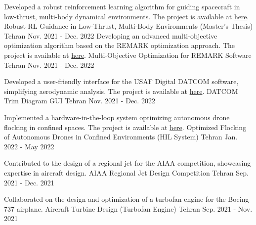 
\begin{cventries}
	
	\cventry
	{Developed a robust reinforcement learning algorithm for guiding spacecraft in low-thrust, multi-body dynamical environments.  The project is available at \href{https://github.com/alibaniasad1999/master-thesis}{here}.}
	{Robust RL Guidance in Low-Thrust, Multi-Body Environments (Master's Thesis)}
	{Tehran}
	{Nov. 2021 - Dec. 2022}
	 {}
	\cventry
	{Developing an advanced multi-objective optimization algorithm based on the REMARK optimization approach. The project is available at \href{https://github.com/alibaniasad1999/Heuristic-optimization-algorithms}{here}.}
	{Multi-Objective Optimization for REMARK Software}
	{Tehran}
	{Nov. 2021 - Dec. 2022}
	{}
	
	\cventry
	{Developed a user-friendly interface for the USAF Digital DATCOM software, simplifying aerodynamic analysis.
	  The project is available at \href{https://github.com/alibaniasad1999/DATCOM-Trim-Diagram-GUI}{here}.
	}
	{DATCOM Trim Diagram GUI}
	{Tehran}
	{Nov. 2021 - Dec. 2022}
	{}
	
	\cventry
	{Implemented a hardware-in-the-loop system optimizing autonomous drone flocking in confined spaces.
		  The project is available at \href{https://github.com/alibaniasad1999/Guidance-and-navigation}{here}.
	}
	{Optimized Flocking of Autonomous Drones in Confined Environments (HIL System)}
	{Tehran}
	{Jan. 2022 - May 2022}
	{}
	
	\cventry
	{Contributed to the design of a regional jet for the AIAA competition, showcasing expertise in aircraft design.}
	{AIAA Regional Jet Design Competition}
	{Tehran}
	{Sep. 2021 - Dec. 2021}
	{}
	
	\cventry
	{Collaborated on the design and optimization of a turbofan engine for the Boeing 737 airplane.}
	{Aircraft Turbine Design (Turbofan Engine)}
	{Tehran}
	{Sep. 2021 - Nov. 2021}
	{}
	
\end{cventries}
